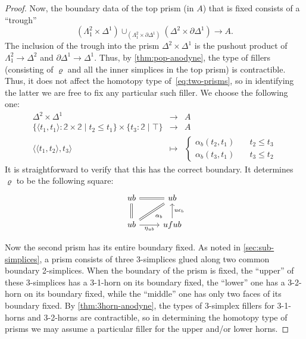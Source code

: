 \documentclass{amsart}
\theoremstyle{plain}
\theoremstyle{definition}
\theoremstyle{remark}
\numberwithin{equation}{section}
\newcommand{\sh}[2]{\{#1\mid #2\}}
\newcommand{\pair}[1]{\langle #1\rangle}
\newcommand{\two}{\mathbb{2}}
\begin{document}
\begin{proof}
  Now, the boundary data of the top prism (in $A$) that is fixed consists of a ``trough''
  \[(\Lambda^2_1 \times \Delta^1) \cup_{(\Lambda^2_1 \times \partial\Delta^1)} (\Delta^2 \times \partial\Delta^1) \to A. \]
  The inclusion of the trough into the prism $\Delta^2\times \Delta^1$ is the pushout product of $\Lambda^2_1 \to\Delta^2$ and $\partial\Delta^1 \to \Delta^1$.
  Thus, by \cref{thm:pop-anodyne}, the type of fillers (consisting of $\varrho$ and all the inner simplices in the top prism) is contractible.
  Thus, it does not affect the homotopy type of~\eqref{eq:two-prisms}, so in identifying the latter we are free to fix any particular such filler.
  We choose the following one:
  \[\begin{array}{ccl}
      \Delta^2 \times \Delta^1 &\to& A\\
      \sh{\pair{t_1,t_1}:\two\times\two}{t_2\le t_1} \times \sh{t_3:\two}{\top} &\to& A\\
      \pair{\pair{t_1,t_2},t_3} &\mapsto&
                                          \begin{cases}
                                            \alpha_{b}(t_2,t_1) &\quad t_2\le t_3\\
                                            \alpha_{b}(t_3,t_1) &\quad t_3\le t_2
                                          \end{cases}
    \end{array}
  \]
  It is straightforward to verify that this has the correct boundary.
  It determines $\varrho$ to be the following square:
  \[
  \begin{tikzcd}
    ub \ar[r,equals] & ub \\
    ub \ar[u,equals] \ar[ur,equals] \ar[r,"\eta_{ub}"'] & ufub \ar[u,"u\epsilon_b"'] \ar[ul,phantom,"\scriptstyle\alpha_b" very near start]
  \end{tikzcd}
  \]

  Now the second prism has its entire boundary fixed.
  As noted in \cref{sec:sub-simplices}, a prism consists of three 3-simplices glued along two common boundary 2-simplices.
  When the boundary of the prism is fixed, the ``upper'' of these 3-simplices has a 3-1-horn on its boundary fixed, the ``lower'' one has a 3-2-horn on its boundary fixed, while the ``middle'' one has only two faces of its boundary fixed.
  By \cref{thm:3horn-anodyne}, the types of 3-simplex fillers for 3-1-horns and 3-2-horns are contractible, so in determining the homotopy type of prisms we may assume a particular filler for the upper and/or lower horns.


\end{proof}
\end{document}
